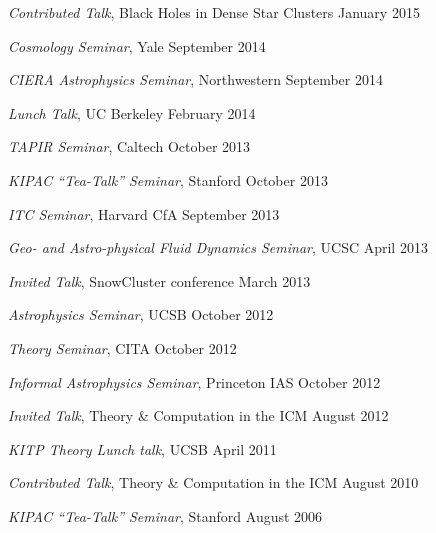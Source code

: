 \begin{talkenum}
\item \textit{Contributed Talk}, Black Holes in Dense Star Clusters \hspace*{\fill} January 2015

\item \textit{Cosmology Seminar}, Yale \hspace*{\fill} September 2014

\item \textit{CIERA Astrophysics Seminar}, Northwestern \hspace*{\fill} September 2014

\item \textit{Lunch Talk}, UC Berkeley \hspace*{\fill} February 2014

\item \textit{TAPIR Seminar}, Caltech \hspace*{\fill} October 2013

\item \textit{KIPAC “Tea-Talk” Seminar}, Stanford \hspace*{\fill} October 2013

\item \textit{ITC Seminar}, Harvard CfA \hspace*{\fill} September 2013

\item \textit{Geo- and Astro-physical Fluid Dynamics Seminar}, UCSC \hspace*{\fill} April 2013

\item \textit{Invited Talk}, SnowCluster conference \hspace*{\fill} March 2013

\item \textit{Astrophysics Seminar}, UCSB \hspace*{\fill} October 2012

\item \textit{Theory Seminar}, CITA \hspace*{\fill} October 2012

\item \textit{Informal Astrophysics Seminar}, Princeton IAS \hspace*{\fill} October 2012

\item \textit{Invited Talk}, Theory \& Computation in the ICM \hspace*{\fill} August 2012

\item \textit{KITP Theory Lunch talk}, UCSB \hspace*{\fill} April 2011

\item \textit{Contributed Talk}, Theory \& Computation in the ICM \hspace*{\fill} August 2010

\item \textit{KIPAC “Tea-Talk” Seminar}, Stanford \hspace*{\fill} August 2006

\end{talkenum}
